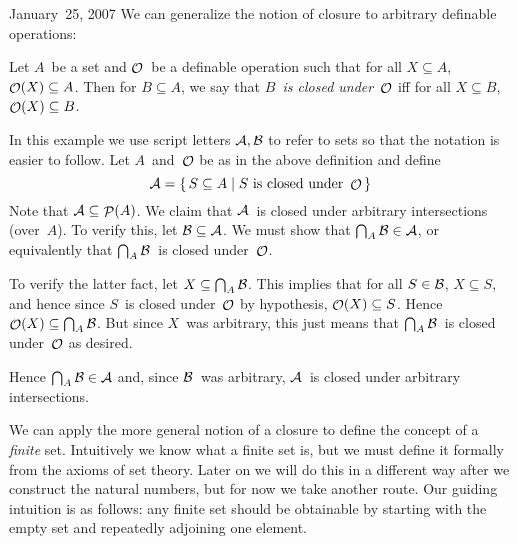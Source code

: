 \begin{lecture}{January~25, 2007}
We can generalize the notion of closure to arbitrary definable operations:
\begin{defn}
Let \(A\)~be a set and \(\mathop{\mathcal{O}}\nolimits\)~be a definable operation such that for all \(X\subseteq A\), \(\mathop{\mathcal{O}}\nolimits(X)\subseteq A\). Then for \(B\subseteq A\), we say that \emph{\(B\)~is closed under~\(\mathop{\mathcal{O}}\nolimits\)} iff for all \(X\subseteq B\), \(\mathop{\mathcal{O}}\nolimits(X)\subseteq B\).
\end{defn}
\begin{example}
In this example we use script letters \(\mathcal{A},\mathcal{B}\) to refer to sets so that the notation is easier to follow. Let \(A\)~and~\(\mathop{\mathcal{O}}\nolimits\) be as in the above definition and define
\[\mathcal{A}=\{\,S\subseteq A\mid S\text{ is closed under }\mathop{\mathcal{O}}\nolimits\,\}\]
Note that \(\mathcal{A}\subseteq\mathop{\mathcal{P}}(A)\). We claim that \(\mathcal{A}\)~is closed under arbitrary intersections (over~\(A\)). To verify this, let \(\mathcal{B}\subseteq\mathcal{A}\). We must show that \(\bigcap_A\mathcal{B}\in\mathcal{A}\), or equivalently that \(\bigcap_A\mathcal{B}\)~is closed under~\(\mathop{\mathcal{O}}\nolimits\).

To verify the latter fact, let \(X\subseteq\bigcap_A\mathcal{B}\). This implies that for all \(S\in\mathcal{B}\), \(X\subseteq S\), and hence since \(S\)~is closed under~\(\mathop{\mathcal{O}}\nolimits\) by hypothesis, \(\mathop{\mathcal{O}}\nolimits(X)\subseteq S\). Hence \(\mathop{\mathcal{O}}\nolimits(X)\subseteq\bigcap_A\mathcal{B}\). But since \(X\)~was arbitrary, this just means that \(\bigcap_A\mathcal{B}\)~is closed under~\(\mathop{\mathcal{O}}\nolimits\) as desired.

Hence \(\bigcap_A\mathcal{B}\in\mathcal{A}\) and, since \(\mathcal{B}\)~was arbitrary, \(\mathcal{A}\)~is closed under arbitrary intersections.
\end{example}

We can apply the more general notion of a closure to define the concept of a \emph{finite} set. Intuitively we know what a finite set is, but we must define it formally from the axioms of set theory. Later on we will do this in a different way after we construct the natural numbers, but for now we take another route. Our guiding intuition is as follows: any finite set should be obtainable by starting with the empty set and repeatedly adjoining one element.


\end{lecture}
